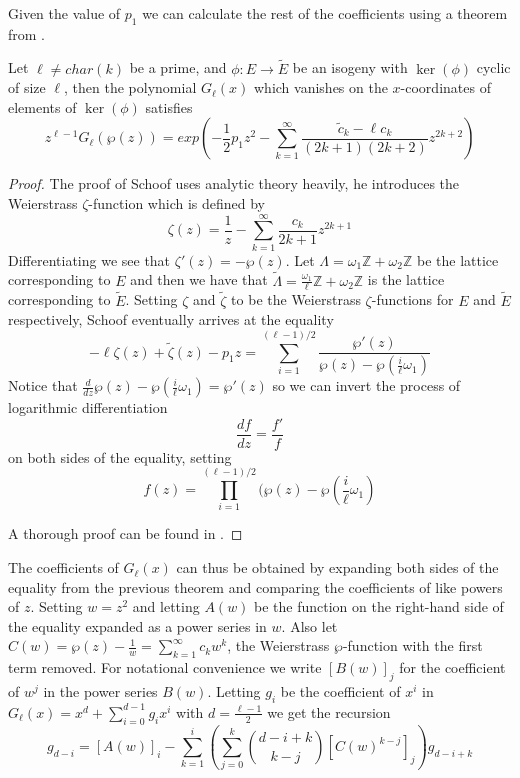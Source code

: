 Given the value of $p_1$ we can calculate the rest of the coefficients using a theorem from \cite{Schoof}.
\begin{thm}
 Let $\ell \neq char(k)$ be a prime, and $\phi: E \rightarrow \widetilde{E}$ be an isogeny with $\ker(\phi)$
cyclic of size $\ell$, then the polynomial $G_\ell(x)$ which vanishes on the $x$-coordinates of
elements of $\ker(\phi)$ satisfies
$$ z^{\ell-1}G_\ell(\wp(z)) = exp(-\frac{1}{2}p_1 z^2 - \sum_{k=1}^\infty \frac{\widetilde{c}_k-\ell c_k}{(2k+1)(2k+2)}z^{2k+2})$$
\end{thm}
\begin{proof}
 The proof of Schoof uses analytic theory heavily, he introduces the Weierstrass $\zeta$-function
which is defined by
$$\zeta(z) = \frac{1}{z} - \sum_{k=1}^\infty \frac{c_k}{2k+1} z^{2k+1} $$
Differentiating we see that $\zeta'(z) = - \wp(z)$. Let $\Lambda = \omega_1 \mathbb{Z}+\omega_2\mathbb{Z}$
be the lattice corresponding to $E$ and then we have that
$\widetilde{\Lambda} = \frac{\omega_1}{\ell}\mathbb{Z}+\omega_2\mathbb{Z}$ is the lattice corresponding
to $\widetilde{E}$. Setting $\zeta$ and $\widetilde{\zeta}$ to be the Weierstrass $\zeta$-functions for
$E$ and $\widetilde{E}$ respectively, Schoof eventually arrives at the equality
$$-\ell \zeta(z)+\widetilde{\zeta}(z)-p_1 z = \sum_{i=1}^{(\ell-1)/2} \frac{\wp'(z)}{\wp(z)-\wp(\frac{i}{\ell}\omega_1)} $$
Notice that $\frac{d}{dz} \wp(z) - \wp(\frac{i}{\ell}\omega_1) = \wp'(z)$ so we can invert the process
of logarithmic differentiation
$$ \frac{df}{dz} = \frac{f'}{f}$$
on both sides of the equality, setting $$f(z) = \prod_{i=1}^{(\ell-1)/2}(\wp(z)-\wp(\frac{i}{\ell}\omega_1)$$

A thorough proof can be found in \cite{Schoof}.
\end{proof}

The coefficients of $G_\ell(x)$ can thus be obtained by expanding both sides of
the equality from the previous theorem and comparing the coefficients of like powers of $z$.
Setting $w=z^2$ and letting $A(w)$ be the function on the right-hand side of the equality
expanded as a power series in $w$. Also let $C(w) = \wp(z) - \frac{1}{w} = \sum_{k=1}^\infty c_k w^k$,
the Weierstrass $\wp$-function with the first term removed. For notational convenience we
write $[B(w)]_j$ for the coefficient of $w^j$ in the power series $B(w)$. Letting $g_i$ be the
coefficient of $x^i$ in $G_\ell(x) = x^d + \sum_{i=0}^{d-1} g_i x^i$ with $d = \frac{\ell-1}{2}$ 
we get the recursion
$$g_{d-i} = [A(w)]_i - \sum_{k=1}^i \left( \sum_{j=0}^k \binom{d-i+k}{k-j} [C(w)^{k-j}]_j \right) g_{d-i+k} $$
